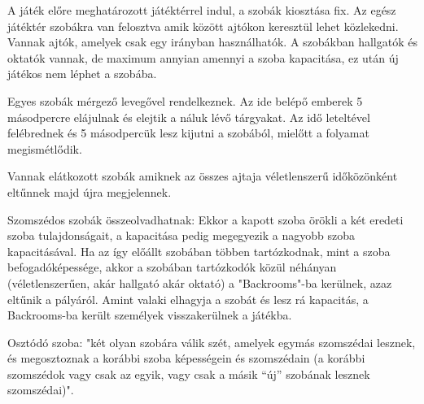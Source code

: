 A játék előre meghatározott játéktérrel indul, a szobák kiosztása fix.
Az egész játéktér szobákra van felosztva amik között ajtókon keresztül lehet közlekedni. Vannak ajtók, amelyek csak egy irányban használhatók. A szobákban hallgatók és oktatók vannak, de maximum annyian amennyi a szoba kapacitása, ez után új játékos nem léphet a szobába. 

Egyes szobák mérgező levegővel rendelkeznek. Az ide belépő emberek 5 másodpercre elájulnak és elejtik a  náluk lévő tárgyakat. Az idő leteltével felébrednek és 5 másodpercük lesz kijutni a szobából, mielőtt a folyamat megismétlődik.

Vannak elátkozott szobák amiknek az összes ajtaja véletlenszerű időközönként eltűnnek majd újra megjelennek.

Szomszédos szobák összeolvadhatnak: Ekkor a kapott szoba örökli a két eredeti szoba tulajdonságait, a kapacitása pedig megegyezik a nagyobb szoba kapacitásával. Ha az így előállt szobában többen tartózkodnak, mint a szoba befogadóképessége, akkor a szobában tartózkodók közül néhányan (véletlenszerűen, akár hallgató akár oktató) a "Backrooms"-ba kerülnek, azaz eltűnik a pályáról. Amint valaki elhagyja a szobát és lesz rá kapacitás, a Backrooms-ba került személyek visszakerülnek a játékba.

Osztódó szoba: "két olyan szobára válik szét, amelyek egymás szomszédai lesznek, és megosztoznak a korábbi szoba képességein és szomszédain (a korábbi szomszédok vagy csak az egyik, vagy csak a másik “új” szobának lesznek szomszédai)". 

